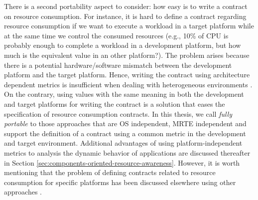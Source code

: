 \begin{itemize}
There is a second portability aspect to consider: how easy is to write a contract on resource consumption.
For instance, it is hard to define a contract regarding resource consumption if we want to execute a workload in a target platform while at the same time we control the consumed resources (e.g., 10\% of CPU is probably enough to complete a workload in a development platform, but how much is the equivalent value in an other platform?).
The problem arises because there is a potential hardware/software mismatch between the development platform and the target platform.
Hence, writing the contract using architecture dependent metrics is insufficient when dealing with heterogeneous environments \cite{Daly2001, Dufour:2003:DMJ:949343.949320}.
On the contrary, using values with the same meaning in both the development and target platforms for writing the contract is a solution that eases the specification of resource consumption contracts.
In this thesis, we call \textit{fully portable} to those approaches that are OS independent, MRTE independent and support the definition of a contract using a common metric in the development and target environment.
Additional advantages of using platform-independent metrics to analysis the dynamic behavior of applications are discussed thereafter in Section \ref{sec:components-oriented-resource-awareness}.
However, it is worth mentioning that the problem of defining contracts related to resource consumption for specific platforms has been discussed elsewhere using other approaches \cite{Lambert200897, Pathak:2012:ESI:2168836.2168841}.




\end{itemize}

